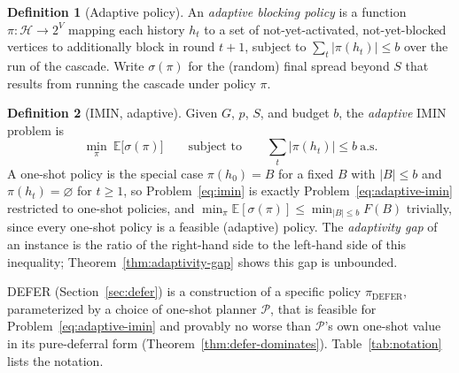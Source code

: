 \documentclass[11pt]{article}
\theoremstyle{definition}
\newtheorem{definition}{Definition}
\theoremstyle{remark}
\newcommand{\FF}{F}
\begin{document}
\begin{definition}[Adaptive policy]\label{def:policy}
An \emph{adaptive blocking policy} is a function
$\pi:\mathcal H\to 2^V$ mapping each history $h_t$ to a set of
not-yet-activated, not-yet-blocked vertices to additionally block in round
$t+1$, subject to $\sum_{t}|\pi(h_t)|\le b$ over the run of the cascade.
Write $\sigma(\pi)$ for the (random) final spread beyond $S$ that results
from running the cascade under policy $\pi$.
\end{definition}

\begin{definition}[IMIN, adaptive]\label{def:adaptive-imin}
Given $G$, $p$, $S$, and budget $b$, the \emph{adaptive} IMIN problem is
\begin{equation}\label{eq:adaptive-imin}
\min_{\pi}\ \mathbb E\bigl[\sigma(\pi)\bigr]
\qquad\text{subject to}\qquad
\textstyle\sum_t|\pi(h_t)|\le b\ \text{a.s.}
\end{equation}
A one-shot policy is the special case $\pi(h_0)=B$ for a fixed
$B$ with $|B|\le b$ and $\pi(h_t)=\varnothing$ for $t\ge1$, so
Problem~\eqref{eq:imin} is exactly Problem~\eqref{eq:adaptive-imin}
restricted to one-shot policies, and
$\min_\pi\mathbb E[\sigma(\pi)]\le\min_{|B|\le b}\FF(B)$ trivially, since
every one-shot policy is a feasible (adaptive) policy. The
\emph{adaptivity gap} of an instance is the ratio of the right-hand side to
the left-hand side of this inequality; Theorem~\ref{thm:adaptivity-gap}
shows this gap is unbounded.
\end{definition}

DEFER (Section~\ref{sec:defer}) is a construction of a specific policy $\pi_{\mathrm{DEFER}}$, parameterized by a choice of one-shot planner $\mathcal P$, that is feasible for Problem~\eqref{eq:adaptive-imin} and provably no worse than $\mathcal P$'s own one-shot value in its pure-deferral form (Theorem~\ref{thm:defer-dominates}). Table~\ref{tab:notation} lists the notation.
\end{document}
